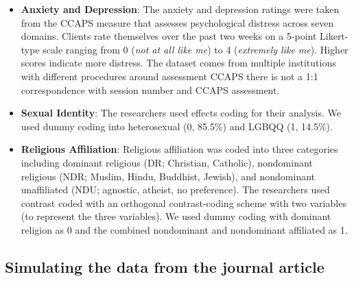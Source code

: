 \documentclass[
  11pt,
]{book}
\begin{document}
\begin{itemize}
\item
  \textbf{Anxiety and Depression}: The anxiety and depression ratings were taken from the CCAPS measure \citep{locke_development_2012} that assesses psychological distress across seven domains. Clients rate themselves over the past two weeks on a 5-point Likert-type scale ranging from 0 (\emph{not at all like me}) to 4 (\emph{extremely like me}). Higher scores indicate more distress. The dataset comes from multiple institutions with different procedures around assessment CCAPS there is not a 1:1 correspondence with session number and CCAPS assessment.
\item
  \textbf{Sexual Identity}: The researchers used effects coding for their analysis. We used dummy coding into heterosexual (0, 85.5\%) and LGBQQ (1, 14.5\%).
\item
  \textbf{Religious Affiliation}: Religious affiliation was coded into three categories including dominant religious (DR; Christian, Catholic), nondominant religious (NDR; Muslim, Hindu, Buddhist, Jewish), and nondominant unaffiliated (NDU; agnostic, atheist, no preference). The researchers used contrast coded with an orthogonal contrast-coding scheme with two variables (to represent the three variables). We used dummy coding with dominant religion as 0 and the combined nondominant and nondominant affiliated as 1.
\end{itemize}

\hypertarget{simulating-the-data-from-the-journal-article-2}{%
\subsection{Simulating the data from the journal article}\label{simulating-the-data-from-the-journal-article-2}}
\end{document}
